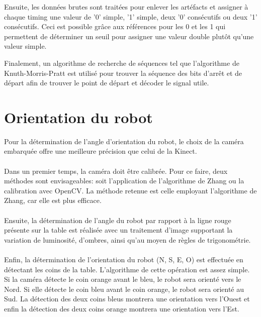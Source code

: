 Ensuite, les données brutes sont traitées pour enlever les artéfacts et assigner à chaque timing une valeur de '0' simple, '1' simple, deux '0' consécutifs ou deux '1' consécutifs. Ceci est possible grâce aux références pour les 0 et les 1 qui permettent de déterminer un seuil pour assigner une valeur double plutôt qu'une valeur simple.

Finalement, un algorithme de recherche de séquences tel que l'algorithme de Knuth-Morris-Pratt est utilisé pour trouver la séquence des bits d'arrêt et de départ afin de trouver le point de départ et décoder le signal utile.

\section{Orientation du robot}

Pour la détermination de l'angle d’orientation du robot, le choix de la caméra embarquée offre une meilleure précision que celui de la Kinect. 

\paragraph{}Dans un premier temps, la caméra doit être calibrée. Pour ce faire, deux méthodes sont envisageables: soit l’application de l’algorithme de Zhang ou la calibration avec OpenCV. La méthode retenue est celle employant l'algorithme de Zhang, car elle est plus efficace. 

\paragraph{}Ensuite, la détermination de l’angle du robot par rapport à la ligne rouge présente sur la table est réalisée avec un traitement d’image supportant la variation de luminosité, d’ombres, ainsi qu'au moyen de règles de trigonométrie.

\paragraph{}Enfin, la détermination de l’orientation du robot (N, S, E, O) est effectuée en détectant les coins de la table. 
L’algorithme de cette opération est assez simple. Si la caméra détecte le coin orange avant le bleu, le robot sera orienté vers le Nord. Si elle détecte le coin bleu avant le coin orange, le robot sera orienté au Sud. La détection des deux coins bleus montrera une orientation vers l’Ouest et enfin la détection des deux coins orange montrera une orientation vers l’Est.

